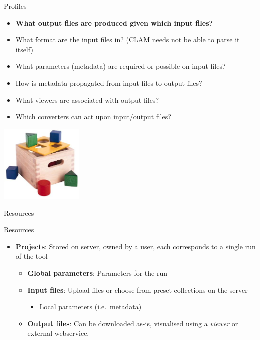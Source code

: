 \documentclass[xcolor=table,10pt,t]{beamer}
\begin{document}
\begin{frame}
    \begin{block}{Profiles}
        \begin{itemize}
            \item \textbf{What output files are produced given which input files?}
            \item What format are the input files in? (CLAM needs not be able to parse it itself)
            \item What parameters (metadata) are required or possible on input files?
            \item How is metadata propagated from input files to output files?
            \item What viewers are associated with output files?
            \item Which converters can act upon input/output files?
        \end{itemize}
    \end{block}
    \includegraphics[width=40.0mm]{blokkendoos.jpg}
\end{frame}



\begin{frame}{Resources}
  \begin{block}{Resources}
      \begin{itemize}
          \item \textbf{Projects}: Stored on server, owned by a user, each corresponds to a single
              run of the tool
          \begin{itemize}
            \item \textbf{Global parameters}: Parameters for the run
            \item \textbf{Input files}: Upload files or choose from preset collections on the server
            \begin{itemize}
                \item Local parameters (i.e.\ metadata)
            \end{itemize}
            \item \textbf{Output files}: Can be downloaded as-is, visualised
                using a \emph{viewer} or external webservice.
          \end{itemize}
      \end{itemize}
  \end{block}
\end{frame}
\end{document}
